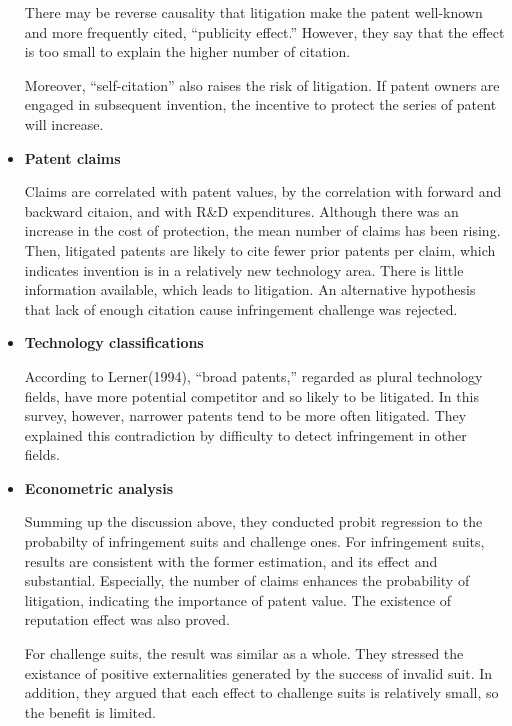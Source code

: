 \documentclass{jsarticle}[12pt]
\begin{document}
\begin{itemize}
   \hspace{1zw}There may be reverse causality that litigation make the patent well-known and more frequently cited, ``publicity effect.'' However, they say that the effect is too small to explain the higher number of citation.
   
   \hspace{1zw}Moreover, ``self-citation'' also raises the risk of litigation. If patent owners are engaged in subsequent invention, the incentive to protect the series of patent will increase.
   
   \item \textbf{Patent claims}
   
   \hspace{1zw}Claims are correlated with patent values, by the correlation with forward and backward citaion, and with R\&D expenditures. Although there was an increase in the cost of protection, the mean number of claims has been rising. Then, litigated patents are likely to cite fewer prior patents per claim, which indicates invention is in a relatively new technology area. There is little information available, which leads to litigation. An alternative hypothesis that lack of enough citation cause infringement challenge was rejected.
   
   \item \textbf{Technology classifications}
   
   \hspace{1zw}According to Lerner(1994), ``broad patents,'' regarded as plural technology fields, have more potential competitor and so likely to be litigated. In this survey, however, narrower patents tend to be more often litigated. They explained this contradiction by difficulty to detect infringement in other fields.
   
   \item \textbf{Econometric analysis}
   
   \hspace{1zw}Summing up the discussion above, they conducted probit regression to the probabilty of infringement suits and challenge ones. For infringement suits, results are consistent with the former estimation, and its effect and substantial. Especially, the number of claims enhances the probability of litigation, indicating the importance of patent value. The existence of reputation effect was also proved.
   
   \hspace{1zw}For challenge suits, the result was similar as a whole. They stressed the existance of positive externalities generated by the success of invalid suit. In addition, they argued that each effect to challenge suits is relatively small, so the benefit is limited.
   
   \end{itemize}
  
\end{document}
